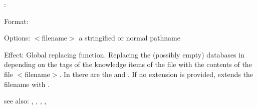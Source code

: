 \replace:

Format: 

Options: $<$filename$>$ a stringified or normal pathname

Effect: Global replacing function.
        Replacing the (possibly empty) databases in \COLAB{} depending on the tags
	of the knowledge items of the file with the contents of the file 
	$<$filename$>$. In \FORWARD{} there are  the  and .
	If no extension is provided, \COLAB{} extends the filename with .

see also: \consult, \destroy, , , 

